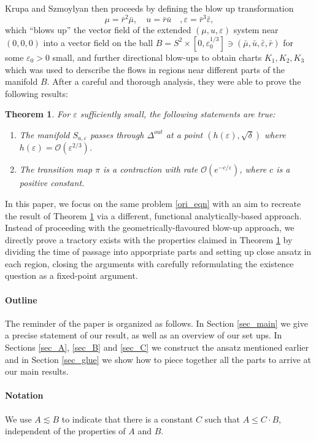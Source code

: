 \documentclass[letterpaper,11pt]{article}
\newcommand{\rmO}{\mathcal{O}}
\newcommand{\eps}{\varepsilon}
\newcommand{\lar}{ \lesssim }
\numberwithin{equation}{section}
\theoremstyle{plain}
\newtheorem{theorem}{Theorem}[section]
\begin{document}
Krupa and Szmoylyan then proceeds by defining the blow up transformation
\[
\mu = \bar{r}^2 \bar{\mu}, \quad u =\bar{r} \bar{u}  \quad, \eps = \bar{r}^3 \bar{\eps},
\]
which ``blows up'' the vector field of the extended $(\mu, u, \eps)$ system near $(0,0,0)$ into a vector field on the ball $B = S^2 \times [0,\eps_0^{1/3}] \ni (\bar{\mu}, \bar{u}, \bar{\eps}, \bar{r})$ for some $\eps_0>0$ small, and further directional blow-ups to obtain charts $K_1,K_2,K_3$ which was used to derscribe the flows in regions near different parts of the manifold $B$. After a careful and thorough analysis, they were able to prove the following results:
\begin{theorem}\label{ks_main}
For $\eps$ sufficiently small, the following statements are true:
\begin{enumerate}
\item The manifold $S_{a,\eps} $ passes through  $\Delta^{out}$ at a point $(h(\eps), \sqrt{\delta})$ where $h(\eps) = \rmO(\eps^{2/3})$.
\item The transition map $\pi$ is a contraction with rate $\rmO(e^{-c/\eps} )$, where $c$ is a positive constant.
\end{enumerate}
\end{theorem}


In this paper, we focus on the same problem \eqref{ori_eqn} with an aim to recreate the result of Theorem \ref{ks_main} via a different, functional analytically-based approach. Instead of proceeding with the geometrically-flavoured blow-up approach, we directly prove a tractory exists with the properties claimed in Theorem \ref{ks_main} by dividing the time of passage into apporpriate parts and setting up close ansatz in each region, closing the arguments with carefully reformulating the existence question as a fixed-point argument.

\paragraph{Outline}
The reminder of the paper is organized as follows. In Section \ref{sec_main} we give a precise statement of our result, as well as an overview of our set ups. In Sections \ref{sec_A}, \ref{sec_B} and \ref{sec_C} we construct the ansatz mentioned earlier and in Section \ref{sec_glue} we show how to piece together all the parts to arrive at our main results.


\paragraph{Notation}
We use $A \lar B$ to indicate that there is a constant $C$ such that $A \le C \cdot B$, independent of the properties of $A$ and $B$.
\end{document}
